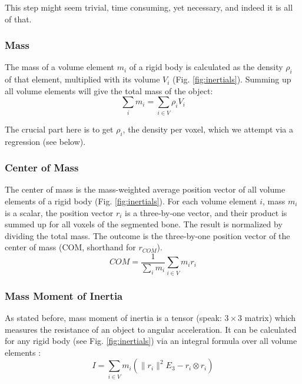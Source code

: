 This step might seem trivial, time consuming, yet necessary, and indeed it is all of that.


\subsubsection{Mass}
\label{sec:org8d42d44}
The mass of a volume element \(m_{i}\) of a rigid body is calculated as the density \(\rho_{i}\) of that element, multiplied with its volume \(V_{i}\) (Fig. \ref{fig:inertials}).
Summing up all volume elements will give the total mass of the object:
\begin{equation}\label{eqn:mass}
\sum_{i} m_{i} = \sum\limits_{i \in V} \rho_{i} V_{i}
\end{equation}

The crucial part here is to get \(\rho_{i}\), the density per voxel, which we attempt via a regression (see below).


\subsubsection{Center of Mass}
\label{sec:orgfde8f74}
The center of mass is the mass-weighted average position vector of all volume elements of a rigid body (Fig. \ref{fig:inertials}).
For each volume element \(i\), mass \(m_{i}\) is a scalar, the position vector \(r_{i}\) is a three-by-one vector, and their product is summed up for all voxels of the segmented bone.
The result is normalized by dividing the total mass.
The outcome is the three-by-one position vector of the center of mass (COM, shorthand for \(r_{COM}\)).
\begin{equation}\label{eqn:com}
 COM = \frac{1}{\sum_i m_{i}} \sum\limits_{i \in V} m_{i} r_{i}
\end{equation}


\subsubsection{Mass Moment of Inertia}
\label{sec:orgaa4bb3d}
As stated before, mass moment of inertia is a tensor (speak: \(3\times 3\) matrix) which measures the resistance of an object to angular acceleration.
It can be calculated for any rigid body (see Fig. \ref{fig:inertials}) via an integral formula over all volume elements \citep{WikipediaMOI}:
\begin{equation}\label{eqn:mmoi}
 I = \sum\limits_{i \in V} m_{i} \left( \lVert r_{i} \rVert^{2}E_3 - r_{i} \otimes r_{i} \right)
\end{equation}


